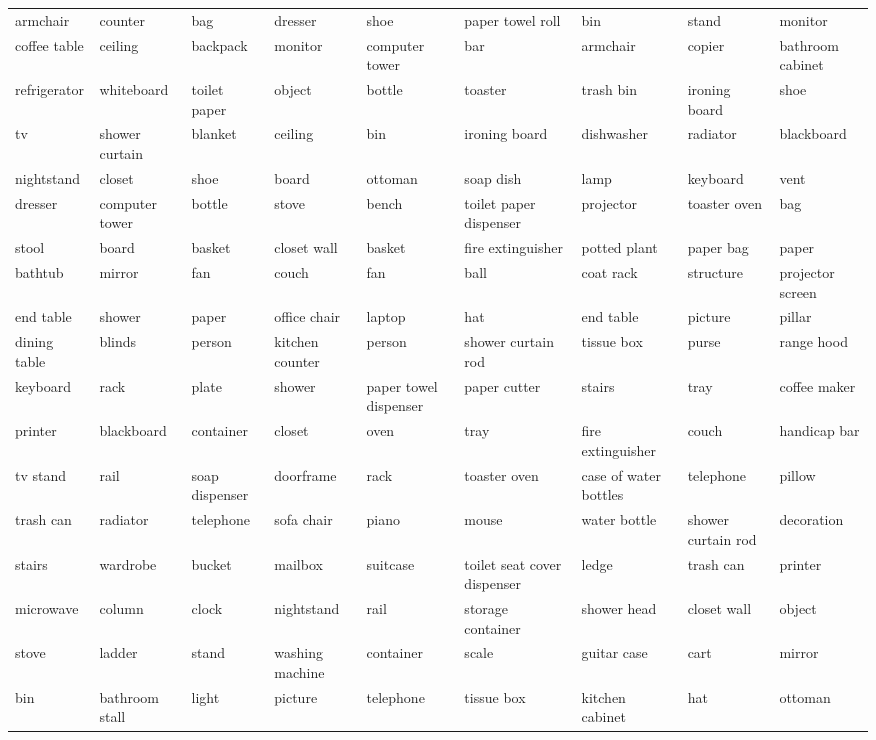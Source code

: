 \begin{table*}[!ht]
{\begin{tabular}{lll|lll|lll}
        armchair & counter & bag & dresser & shoe & paper towel roll & bin & stand & monitor \\ 
        coffee table & ceiling & backpack & monitor & computer tower & bar & armchair & copier & bathroom cabinet \\ 
        refrigerator & whiteboard & toilet paper & object & bottle & toaster & trash bin & ironing board & shoe \\ 
        tv & shower curtain & blanket & ceiling & bin & ironing board & dishwasher & radiator & blackboard \\ 
        nightstand & closet & shoe & board & ottoman & soap dish & lamp & keyboard & vent \\ 
        dresser & computer tower & bottle & stove & bench & toilet paper dispenser & projector & toaster oven & bag \\ 
        stool & board & basket & closet wall & basket & fire extinguisher & potted plant & paper bag & paper \\ 
        bathtub & mirror & fan & couch & fan & ball & coat rack & structure & projector screen \\ 
        end table & shower & paper & office chair & laptop & hat & end table & picture & pillar \\ 
        dining table & blinds & person & kitchen counter & person & shower curtain rod & tissue box & purse & range hood \\ 
        keyboard & rack & plate & shower & paper towel dispenser & paper cutter & stairs & tray & coffee maker \\ 
        printer & blackboard & container & closet & oven & tray & fire extinguisher & couch & handicap bar \\ 
        tv stand & rail & soap dispenser & doorframe & rack & toaster oven & case of water bottles & telephone & pillow \\ 
        trash can & radiator & telephone & sofa chair & piano & mouse & water bottle & shower curtain rod & decoration \\ 
        stairs & wardrobe & bucket & mailbox & suitcase & toilet seat cover dispenser & ledge & trash can & printer \\ 
        microwave & column & clock & nightstand & rail & storage container & shower head & closet wall & object \\ 
        stove & ladder & stand & washing machine & container & scale & guitar case & cart & mirror \\ 
        bin & bathroom stall & light & picture & telephone & tissue box & kitchen cabinet & hat & ottoman \\ 

\end{tabular}}
\end{table*}

